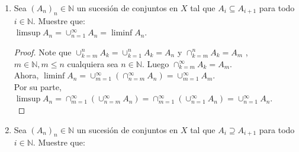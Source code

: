 \documentclass[spanish,12pt,a4paper,openany]{book}
\begin{document}
\begin{enumerate}
			Defina:\\
			$\limsup A_{n} = \cap _{m=1} ^{\infty} (\cup _{n=m} ^{\infty} A_{n})$.\\ 
			$\liminf A_{n} = \cup _{m=1} ^{\infty} (\cap _{n=m} ^{\infty} A_{n})$.\\
			
			Muestre que:\\
			$\emptyset \subseteq \liminf A_{n} \subseteq \limsup A_{n} \subseteq X$.
			
			\begin{proof}
				La única inclusión no trivial es $\liminf A_{n} \subseteq \limsup A_{n}$.\\
				
				Primero note que $\left\{\cup_{n=k} ^{\infty} A_{n}\right\}_{k \in \mathbb{N}}$ es una secuencia decreciente.\\
				
				Sea $x \in \liminf A_{n}$. Existe $p \in \mathbb{N}$ tal que para todo entero $k \geq p, x \in A_{k}$ y por ende $x \in \cup_{n=k} ^{\infty} A_{n}$, por lo dicho en la línea de arriba, $\cup_{n=k} ^{\infty} A_{n} \supseteq\cup_{n=p} ^{\infty} A_{n}$, para todo $1 \leq k \leq p$, luego $x \in \cup_{n=1} ^{\infty} A_{n}$ para todo entero $n \geq 1$, ergo, $x \in \cap _{m=1} ^{\infty} (\cup _{n=m} ^{\infty} A_{n}) = \limsup A_{n}$.
			\end{proof}
		\item Sea $(A_{n})_n \in \mathbb{N}$ un sucesión de conjuntos en $X$ tal que $A_{i} \subseteq A_{i+1}$ para todo $i \in \mathbb{N}$. Muestre que:\\
		
		$\limsup A_{n} = \cup_{n=1} ^{\infty} A_{n}= \liminf A_{n} $.
		\begin{proof}
			
			 Note que $\cup_{k=m}^{n} A_{k} = \cup_{k=1} ^{n} A_{k}= A_{n}$ y $\cap_{k=m}^{n} A_{k} = A_{m}$ , $m \in \mathbb{N}, m \leq n$ cualquiera sea $n \in \mathbb{N}$. Luego $\cap_{k=m}^{\infty} A_{k} = A_{m}$.\\
			 
			 Ahora, $\liminf A_{n} = \cup _{m=1} ^{\infty} (\cap _{n=m} ^{\infty} A_{n}) = \cup _{m=1} ^{\infty} A_{m}$.\\
			 
			 Por su parte, $\limsup A_{n} = \cap _{m=1} ^{\infty} (\cup _{n=m} ^{\infty} A_{n}) = \cap _{m=1} ^{\infty} (\cup _{n=1} ^{\infty} A_{n}) = \cup_{n=1} ^{\infty} A_{n}$.\\
		\end{proof}
		\item Sea $(A_{n})_n \in \mathbb{N}$ un sucesión de conjuntos en $X$ tal que $A_{i} \supseteq A_{i+1}$ para todo $i \in \mathbb{N}$. Muestre que:\\
		

\end{enumerate}
\end{document}
